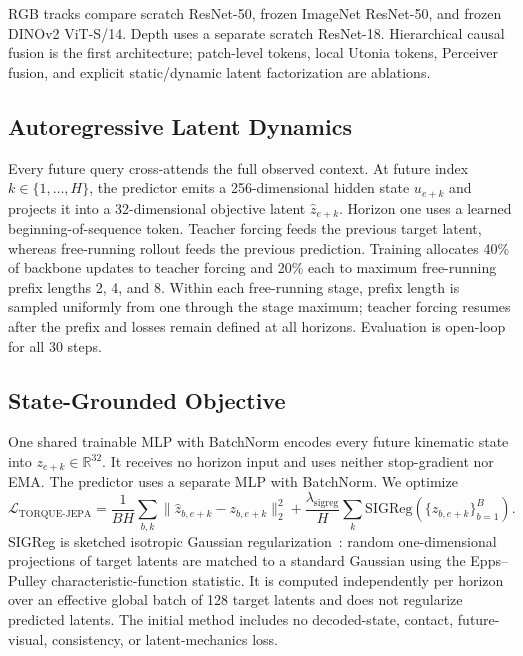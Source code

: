 \documentclass{article}
\begin{document}
RGB tracks compare scratch ResNet-50, frozen ImageNet ResNet-50, and frozen DINOv2 ViT-S/14. Depth uses a separate scratch ResNet-18. Hierarchical causal fusion is the first architecture; patch-level tokens, local Utonia tokens, Perceiver fusion, and explicit static/dynamic latent factorization are ablations.

\subsection{Autoregressive Latent Dynamics}

Every future query cross-attends the full observed context. At future index $k\in\{1,\ldots,H\}$, the predictor emits a 256-dimensional hidden state $u_{e+k}$ and projects it into a 32-dimensional objective latent $\hat z_{e+k}$. Horizon one uses a learned beginning-of-sequence token. Teacher forcing feeds the previous target latent, whereas free-running rollout feeds the previous prediction. Training allocates 40\% of backbone updates to teacher forcing and 20\% each to maximum free-running prefix lengths 2, 4, and 8. Within each free-running stage, prefix length is sampled uniformly from one through the stage maximum; teacher forcing resumes after the prefix and losses remain defined at all horizons. Evaluation is open-loop for all 30 steps.

\subsection{State-Grounded Objective}

One shared trainable MLP with BatchNorm encodes every future kinematic state into $z_{e+k}\in\mathbb{R}^{32}$. It receives no horizon input and uses neither stop-gradient nor EMA. The predictor uses a separate MLP with BatchNorm. We optimize
\begin{equation}
\mathcal{L}_{\mathrm{TORQUE\text{-}JEPA}}=
\frac{1}{BH}\sum_{b,k}\lVert\hat z_{b,e+k}-z_{b,e+k}\rVert_2^2
+\frac{\lambda_{\mathrm{sigreg}}}{H}\sum_k
\mathrm{SIGReg}(\{z_{b,e+k}\}_{b=1}^B).
\end{equation}
SIGReg is sketched isotropic Gaussian regularization~\cite{maes_leworldmodel_2026}: random one-dimensional projections of target latents are matched to a standard Gaussian using the Epps--Pulley characteristic-function statistic. It is computed independently per horizon over an effective global batch of 128 target latents and does not regularize predicted latents. The initial method includes no decoded-state, contact, future-visual, consistency, or latent-mechanics loss.
\end{document}
